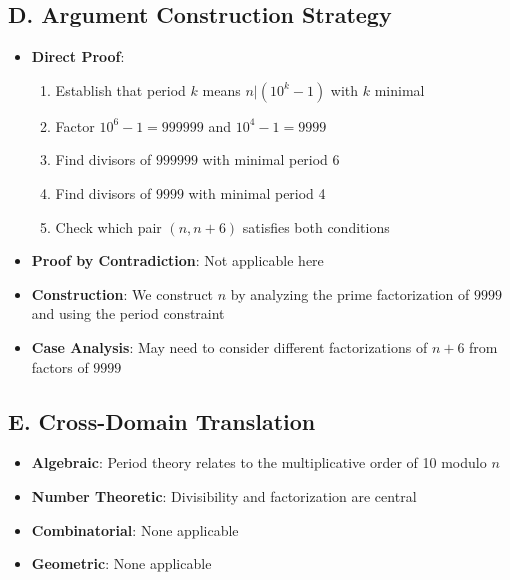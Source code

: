 \documentclass[11pt]{article}
\begin{document}
\begin{strategicbox}
\subsection*{D. Argument Construction Strategy}
\begin{itemize}[leftmargin=*]
    \item \textbf{Direct Proof}: 
    \begin{enumerate}
        \item Establish that period $k$ means $n | (10^k - 1)$ with $k$ minimal
        \item Factor $10^6 - 1 = 999999$ and $10^4 - 1 = 9999$
        \item Find divisors of $999999$ with minimal period 6
        \item Find divisors of $9999$ with minimal period 4
        \item Check which pair $(n, n+6)$ satisfies both conditions
    \end{enumerate}
    
    \item \textbf{Proof by Contradiction}: Not applicable here
    
    \item \textbf{Construction}: We construct $n$ by analyzing the prime factorization of $9999$ and using the period constraint
    
    \item \textbf{Case Analysis}: May need to consider different factorizations of $n+6$ from factors of $9999$
\end{itemize}

\subsection*{E. Cross-Domain Translation}
\begin{itemize}[leftmargin=*]
    \item \textbf{Algebraic}: Period theory relates to the multiplicative order of 10 modulo $n$
    \item \textbf{Number Theoretic}: Divisibility and factorization are central
    \item \textbf{Combinatorial}: None applicable
    \item \textbf{Geometric}: None applicable
\end{itemize}
\end{strategicbox}
\end{document}

